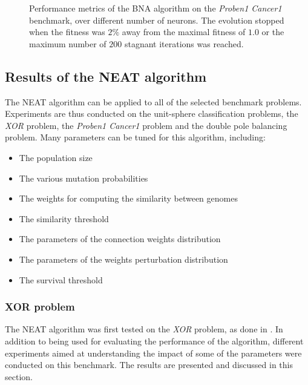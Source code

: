 \begin{figure}
\begin{center}
    \end{center}
    \caption{Performance metrics of the BNA algorithm on the \textit{Proben1 Cancer1} benchmark, over different number of neurons.
    The evolution stopped when the fitness was $2\%$ away from the maximal fitness of $1.0$ or the maximum number of $200$ stagnant iterations was reached.}
    \label{fig:bna_proben1}
\end{figure}

\subsection{Results of the NEAT algorithm}

The NEAT algorithm can be applied to all of the selected benchmark problems. Experiments are thus conducted on the unit-sphere classification problems, the \textit{XOR}
problem, the \textit{Proben1 Cancer1} problem and the double pole balancing problem. Many parameters can be tuned for this algorithm, including:

\begin{itemize}
    \item The population size
    \item The various mutation probabilities
    \item The weights for computing the similarity between genomes
    \item The similarity threshold
    \item The parameters of the connection weights distribution
    \item The parameters of the weights perturbation distribution
    \item{The survival threshold}
\end{itemize}

\subsubsection{XOR problem}

The NEAT algorithm was first tested on the \textit{XOR} problem, as done in \cite{neat}. In addition to being used for evaluating the performance of the algorithm, different experiments aimed
at understanding the impact of some of the parameters were conducted on this benchmark. The results are presented and discussed in this section.

